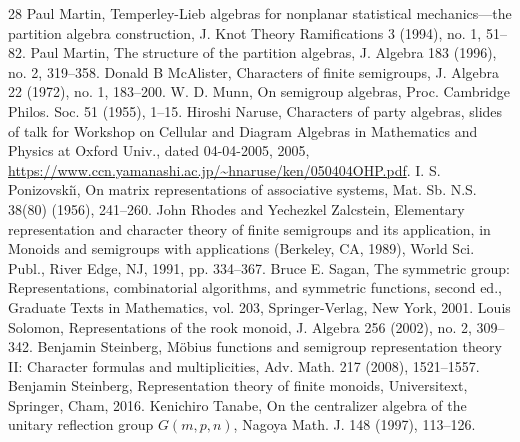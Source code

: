 \begin{thebibliography}{28}
 Paul Martin, Temperley-Lieb algebras for nonplanar statistical mechanics---the partition algebra construction, J. Knot Theory Ramifications 3 (1994), no. 1, 51--82.
 Paul Martin, The structure of the partition algebras, J. Algebra 183 (1996), no. 2, 319--358.
 Donald B McAlister, Characters of finite semigroups, J. Algebra 22 (1972), no. 1, 183--200.
 W. D. Munn, On semigroup algebras, Proc. Cambridge Philos. Soc. 51 (1955), 1--15.
 Hiroshi Naruse, Characters of party algebras, slides of talk for Workshop on Cellular and Diagram Algebras in Mathematics and Physics at Oxford Univ., dated 04-04-2005, 2005, \url{https://www.ccn.yamanashi.ac.jp/~hnaruse/ken/050404OHP.pdf}.
 I. S. Ponizovski\u\i, On matrix representations of associative systems, Mat. Sb. N.S. 38(80) (1956), 241--260.
 John Rhodes and Yechezkel Zalcstein, Elementary representation and character theory of finite semigroups and its application, in Monoids and semigroups with applications (Berkeley, CA, 1989), World Sci. Publ., River Edge, NJ, 1991, pp. 334--367.
 Bruce E. Sagan, The symmetric group: Representations, combinatorial algorithms, and symmetric functions, second ed., Graduate Texts in Mathematics, vol. 203, Springer-Verlag, New York, 2001.
 Louis Solomon, Representations of the rook monoid, J. Algebra 256 (2002), no. 2, 309--342.
 Benjamin Steinberg, M\"obius functions and semigroup representation theory II: Character formulas and multiplicities, Adv. Math. 217 (2008), 1521--1557.
 Benjamin Steinberg, Representation theory of finite monoids, Universitext, Springer, Cham, 2016.
 Kenichiro Tanabe, On the centralizer algebra of the unitary reflection group $G(m,p,n)$, Nagoya Math. J. 148 (1997), 113--126.
\end{thebibliography}
